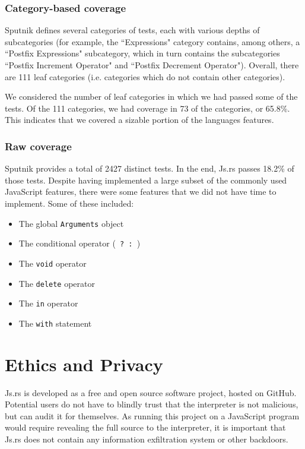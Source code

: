 \documentclass{article}
\begin{document}
\begin{multicols}{2}
\subsubsection*{Category-based coverage}

Sputnik defines several categories of tests, each with various depths of
subcategories (for example, the ``Expressions" category contains, among others,
a ``Postfix Expressions" subcategory, which in turn contains the subcategories
``Postfix Increment Operator" and ``Postfix Decrement Operator"). Overall, there
are 111 leaf categories (i.e. categories which do not contain other
categories). \newline

We considered the number of leaf categories in which we had passed some of the
tests. Of the 111 categories, we had coverage in 73 of the categories, or
65.8\%. This indicates that we covered a sizable portion of the languages
features.

\subsubsection*{Raw coverage}

Sputnik provides a total of 2427 distinct tests. In the end, Js.rs passes 18.2\%
of those tests. Despite having implemented a large subset of the commonly used
JavaScript features, there were some features that we did not have time to
implement. Some of these included:

\begin{itemize}
  \item The global \texttt{Arguments} object
  \item The conditional operator (\texttt{ ? : })
  \item The \texttt{void} operator
  \item The \texttt{delete} operator
  \item The \texttt{in} operator
  \item The \texttt{with} statement
\end{itemize}

\section{Ethics and Privacy}

Js.rs is developed as a free and open source software project, hosted on GitHub.
Potential users do not have to blindly trust that the interpreter is not
malicious, but can audit it for themselves. As running this project on a
JavaScript program would require revealing the full source to the interpreter,
it is important that Js.rs does not contain any information exfiltration system
or other backdoors. \newline


\end{multicols}
\end{document}
